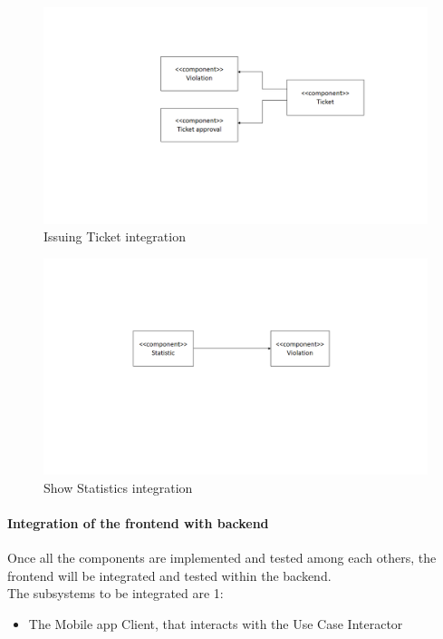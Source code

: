 \begin{figure}[H]
\centering
\includegraphics[width=\textwidth]{Images/TicketIntegration.png}
\caption{\label{fig:TicketIntegrationn} Issuing Ticket integration}
\end{figure}

\begin{figure}[H]
\centering
\includegraphics[width=\textwidth]{Images/StatisticsIntegration.png}
\caption{\label{fig:StatisticsIntegration} Show Statistics integration}
\end{figure}

\paragraph{Integration of the frontend with backend}
Once all the components are implemented and tested among each others, the frontend will be integrated and tested within the backend. \\
The subsystems to be integrated are 1:
\begin{itemize}
       \item The Mobile app Client, that interacts with the Use Case Interactor
\end{itemize}

